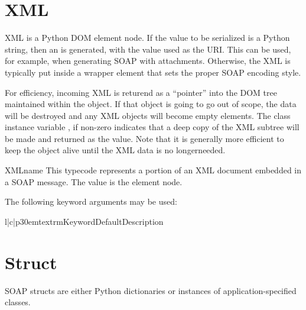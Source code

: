\section{XML}

XML is a Python DOM element node.
If the value to be serialized is a Python string, then an 
is generated, with the value used as the URI.
This can be used, for example, when generating SOAP with attachments.
Otherwise, the XML is typically put inside a wrapper element that sets
the proper SOAP encoding style.

For efficiency, incoming XML is returend as a ``pointer'' into the
DOM tree maintained within the  object.
If that object is going to go out of scope, the data will be destroyed
and any XML objects will become empty elements.
The class instance variable , if non-zero indicates that a
deep copy of the XML subtree will be made and returned as the value.
Note that it is generally more efficient to keep the 
object alive until the XML data is no longerneeded.

\begin{classdesc}{XML}{name}
This typecode represents a portion of an XML document embedded in a SOAP
message.
The value is the element node.

The following keyword arguments may be used:

\begin{tableiii}{l|c|p{30em}}{textrm}{Keyword}{Default}{Description}
\end{tableiii}
\end{classdesc}

\section{Struct}

SOAP structs are either Python dictionaries or
instances of application-specified classes.

